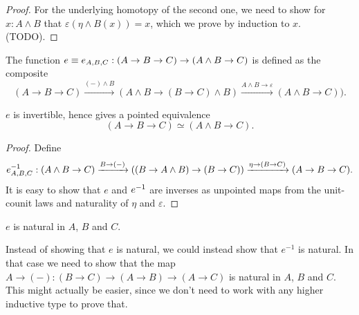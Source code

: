 \documentclass{article}
\newcommand{\pmap}{\to}
\newcommand{\lpmap}{\xrightarrow}
\renewcommand{\smash}{\wedge}
\renewcommand{\epsilon}{\varepsilon}
\renewcommand{\o}{\ensuremath{\circ}}
\begin{document}
\begin{proof}
  For the underlying homotopy of the second one, we need to show for $x:A\smash B$ that
  $\epsilon(\eta\smash B(x))=x$, which we prove by induction to $x$. (TODO).

\end{proof}

\begin{defn}
The function $e\jdeq e_{A,B,C}:(A\pmap B\pmap C)\pmap(A\smash B\pmap C)$ is defined as the composite
$$(A\pmap B\pmap C)\lpmap{({-})\smash B}(A\smash B\pmap (B\pmap C)\smash B)\lpmap{A\smash B \pmap\epsilon}(A\smash B\pmap C)).$$
\end{defn}

\begin{lem}
  $e$ is invertible, hence gives a pointed equivalence $$(A\pmap B\pmap C)\simeq(A\smash B\pmap C).$$
\end{lem}
\begin{proof}
  Define
  $$\inv{e}_{A,B,C}:(A\smash B\pmap C)\lpmap{B\pmap({-})}((B\pmap A\smash B)\pmap (B\pmap
  C))\lpmap{\eta\pmap(B\pmap C)}(A\pmap B\pmap C).$$ It is easy to show that $e$ and ${e}^{-1}$ are
  inverses as unpointed maps from the unit-counit laws and naturality of $\eta$ and $\epsilon$.

\end{proof}
\begin{lem}\label{e-natural}
$e$ is natural in $A$, $B$ and $C$.
\end{lem}
\begin{rmk}
\item Instead of showing that $e$ is natural, we could instead show that $e^{-1}$ is natural. In
  that case we need to show that the map $A\to({-}):(B\to C)\to(A\to B)\to(A\to C)$ is natural in
  $A$, $B$ and $C$. This might actually be easier, since we don't need to work with any higher
  inductive type to prove that.
\end{rmk}
\end{document}
